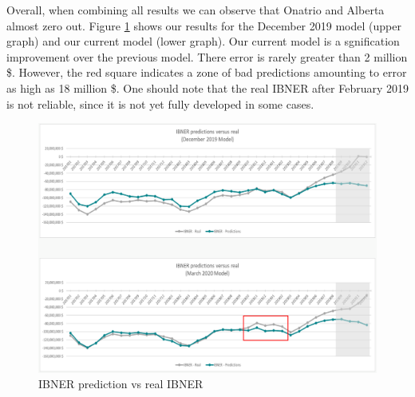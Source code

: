 	Overall, when combining all results we can observe that Onatrio and Alberta almost zero out. Figure \ref{Fig_IBNER_preds} shows our results for the December 2019 model (upper graph) and our current model (lower graph). Our current model is a sgnification improvement over the previous model. There error is rarely greater than 2 million \$. However, the red square indicates a zone of bad predictions amounting to error as high as 18 million \$. One should note that the real IBNER after February 2019 is not reliable, since it is not yet fully developed in some cases.
	
	\begin{figure}[H]
		\begin{center}
			\includegraphics[scale=0.4]{Graphiques/JAN_vs_MARCH} 
			\renewcommand{\figurename}{Figure}
			\caption{IBNER prediction vs real IBNER}\label{Fig_IBNER_preds}
		\end{center}
	\end{figure}

